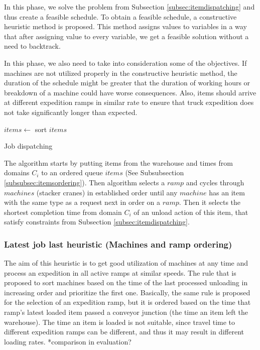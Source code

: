 \documentclass{ctuthesis}
\begin{document}
In this phase, we solve the problem from Subsection \ref{subsec:itemdispatching} and thus create a feasible schedule.
To obtain a feasible schedule, a constructive heuristic method is proposed. This method assigns values to variables in a way that after assigning value to every variable, we get a feasible solution without a need to backtrack.

In this phase, we also need to take into consideration some of the objectives. If machines are not utilized properly in the constructive heuristic method, the duration of the schedule might be greater that the duration of working hours or breakdown of a machine could have worse consequences. Also, items should arrive at different expedition ramps in similar rate to ensure that truck expedition does not take significantly longer than expected.

\begin{algorithm}[H]
\SetAlgoLined
{}
  $items \leftarrow$ sort $items$\;
\caption{Job dispatching}
\end{algorithm}

The algorithm starts by putting items from the warehouse and times from domains $C_i$ to an ordered queue $items$ (See Subsubsection \ref{subsubsec:itemsordering}). Then algorithm selects a $ramp$ and cycles through $machines$ (stacker cranes) in established order until any $machine$ has an item with the same type as a request next in order on a $ramp$. Then it selects the shortest completion time from domain $C_i$ of an unload action of this item, that satisfy constraints from Subsection \ref{subsec:itemdispatching}. 


\subsubsection{Latest job last heuristic (Machines and ramp ordering)}

The aim of this heuristic is to get good utilization of machines at any time and process an expedition in all active ramps at similar speeds. The rule that is proposed to sort machines based on the time of the last processed unloading in increasing order and prioritize the first one. 
Basically, the same rule is proposed for the selection of an expedition ramp, but it is ordered based on the time that ramp's latest loaded item passed a conveyor junction (the time an item left the warehouse). The time an item is loaded is not suitable, since travel time to different expedition ramps can be different, and thus it may result in different loading rates. *comparison in evaluation?
\end{document}
